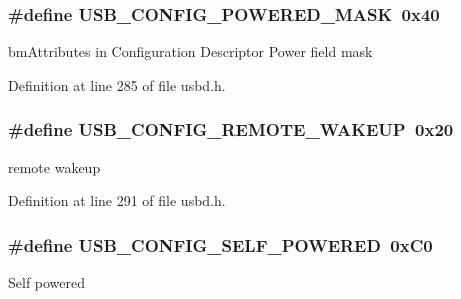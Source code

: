 \subsubsection[{\texorpdfstring{U\+S\+B\+\_\+\+C\+O\+N\+F\+I\+G\+\_\+\+P\+O\+W\+E\+R\+E\+D\+\_\+\+M\+A\+SK}{USB_CONFIG_POWERED_MASK}}]{\setlength{\rightskip}{0pt plus 5cm}\#define U\+S\+B\+\_\+\+C\+O\+N\+F\+I\+G\+\_\+\+P\+O\+W\+E\+R\+E\+D\+\_\+\+M\+A\+SK~0x40}\hypertarget{group__USBD__Core_gafdd4f846b5497985c182a1a090d99729}{}\label{group__USBD__Core_gafdd4f846b5497985c182a1a090d99729}
bm\+Attributes in Configuration Descriptor Power field mask 

Definition at line 285 of file usbd.\+h.

\subsubsection[{\texorpdfstring{U\+S\+B\+\_\+\+C\+O\+N\+F\+I\+G\+\_\+\+R\+E\+M\+O\+T\+E\+\_\+\+W\+A\+K\+E\+UP}{USB_CONFIG_REMOTE_WAKEUP}}]{\setlength{\rightskip}{0pt plus 5cm}\#define U\+S\+B\+\_\+\+C\+O\+N\+F\+I\+G\+\_\+\+R\+E\+M\+O\+T\+E\+\_\+\+W\+A\+K\+E\+UP~0x20}\hypertarget{group__USBD__Core_ga7b28a766a8a916fae421d52fbedd2cba}{}\label{group__USBD__Core_ga7b28a766a8a916fae421d52fbedd2cba}
remote wakeup 

Definition at line 291 of file usbd.\+h.

\subsubsection[{\texorpdfstring{U\+S\+B\+\_\+\+C\+O\+N\+F\+I\+G\+\_\+\+S\+E\+L\+F\+\_\+\+P\+O\+W\+E\+R\+ED}{USB_CONFIG_SELF_POWERED}}]{\setlength{\rightskip}{0pt plus 5cm}\#define U\+S\+B\+\_\+\+C\+O\+N\+F\+I\+G\+\_\+\+S\+E\+L\+F\+\_\+\+P\+O\+W\+E\+R\+ED~0x\+C0}\hypertarget{group__USBD__Core_ga8c322771b797c09e3066a388b46e9ef9}{}\label{group__USBD__Core_ga8c322771b797c09e3066a388b46e9ef9}
Self powered 

